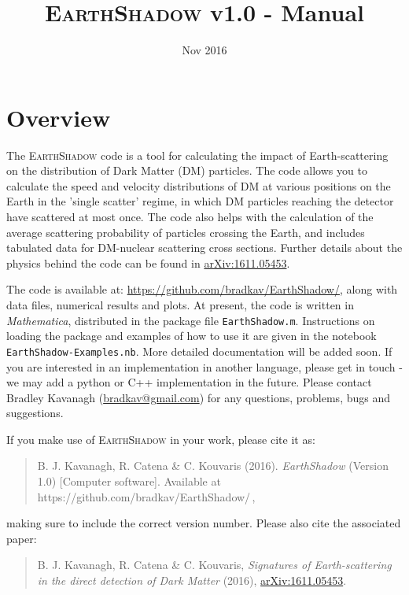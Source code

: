 \documentclass[notitlepage,12pt]{article}
\newcommand{\EarthShadow}{\textsc{EarthShadow}\xspace}
\newcommand{\ourpaper}{\href{http://arxiv.org/abs/1611.05453}{arXiv:1611.05453}\xspace}
\begin{document}
\title{\EarthShadow v1.0 - Manual \\ \vspace{0.5cm}\normalsize}

\date{\vspace{-1cm} Nov 2016}

\maketitle


\section{Overview}

The \EarthShadow code is a tool for calculating the impact of Earth-scattering on the distribution of Dark Matter (DM) particles. The code allows you to calculate the speed and velocity distributions of DM at various positions on the Earth in the 'single scatter' regime, in which DM particles reaching the detector have scattered at most once. The code also helps with the calculation of the average scattering probability of particles crossing the Earth, and includes tabulated data for DM-nuclear scattering cross sections. Further details about the physics behind the code can be found in \ourpaper.

The code is available at: \href{https://github.com/bradkav/EarthShadow/}{https://github.com/bradkav/EarthShadow/}, along with data files, numerical results and plots. At present, the code is written in \textit{Mathematica}, distributed in the package file \texttt{EarthShadow.m}. Instructions on loading the package and examples of how to use it are given in the notebook \texttt{EarthShadow-Examples.nb}. More detailed documentation will be added soon. If you are interested in an implementation in another language, please get in touch - we may add a python or C++ implementation in the future. Please contact Bradley Kavanagh (\href{mailto:bradkav@gmail.com?subject=EarthShadow v1.0}{bradkav@gmail.com}) for any questions, problems, bugs and suggestions.

If you make use of \EarthShadow in your work, please cite it as:

\begin{quote}
B. J. Kavanagh, R. Catena \& C. Kouvaris (2016). \textit{EarthShadow} (Version 1.0) [Computer software]. Available at https://github.com/bradkav/EarthShadow/\,,
\end{quote}
making sure to include the correct version number. Please also cite the associated paper:

\begin{quote}

B. J. Kavanagh, R. Catena \& C. Kouvaris, \textit{Signatures of Earth-scattering in the direct detection of Dark Matter} (2016), \ourpaper.
\end{quote}
\end{document}
